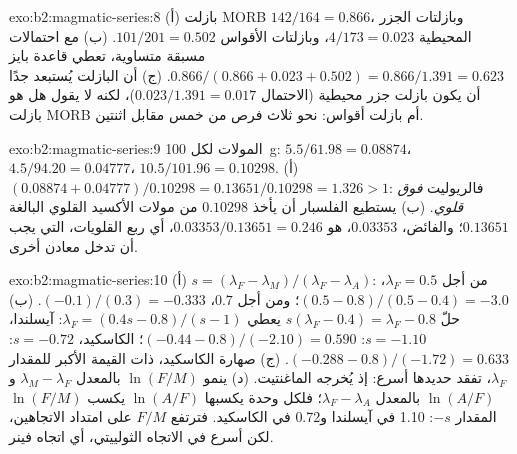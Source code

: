 \begin{solution}{exo:b2:magmatic-series:8}
(أ) بازلت MORB $142/164 = 0.866$، وبازلتات الجزر المحيطية $4/173 = 0.023$، وبازلتات الأقواس $101/201 =
0.502$. (ب) مع احتمالات مسبقة متساوية، تعطي قاعدة بايز $0.866/(0.866 + 0.023 + 0.502) =
0.866/1.391 = 0.623$. (ج) أن البازلت يُستبعد جدًا أن يكون بازلت جزر محيطية
(الاحتمال $0.023/1.391 = 0.017$)، لكنه لا يقول هل هو بازلت MORB أم بازلت أقواس:
نحو ثلاث فرص من خمس مقابل اثنتين.
\end{solution}

\begin{solution}{exo:b2:magmatic-series:9}
المولات لكل \qty{100}{g}:  $5.5/61.98 = 0.08874$،  $4.5/94.20 =
0.04777$،  $10.5/101.96 = 0.10298$. (أ) $(0.08874 + 0.04777)/0.10298 =
0.13651/0.10298 = 1.326 > 1$: فالريوليت \emph{فوق قلوي}. (ب) يستطيع الفلسبار
أن يأخذ $0.10298$ من مولات الأكسيد القلوي البالغة $0.13651$؛ والفائض، $0.03353$، هو
$0.03353/0.13651 = 0.246$، أي ربع القلويات، التي يجب أن تدخل معادن أخرى.
\end{solution}

\begin{solution}{exo:b2:magmatic-series:10}
(أ) $s = (\lambda_F - \lambda_M)/(\lambda_F - \lambda_A)$: من أجل $\lambda_F = 0.5$، $(0.5
- 0.8)/(0.5 - 0.4) = -3.0$؛ ومن أجل $0.7$، $(-0.1)/(0.3) = -0.333$. (ب) حلّ
$s(\lambda_F - 0.4) = \lambda_F - 0.8$ يعطي $\lambda_F = (0.4s - 0.8)/(s - 1)$:
آيسلندا، $s = -1.10$: $(-0.44 - 0.8)/(-2.10) = 0.590$؛ الكاسكيد، $s = -0.72$:
$(-0.288 - 0.8)/(-1.72) = 0.633$. (ج) صهارة الكاسكيد، ذات القيمة الأكبر للمقدار
$\lambda_F$، تفقد حديدها أسرع: إذ يُخرجه الماغنتيت. (د) ينمو $\ln(F/M)$
بالمعدل $\lambda_M - \lambda_F$ و$\ln(A/F)$ بالمعدل $\lambda_F - \lambda_A$؛ فلكل
وحدة يكسبها $\ln(A/F)$ يكسب $\ln(F/M)$ المقدار $-s$: 1.10 في آيسلندا و0.72 في
الكاسكيد. فترتفع $F/M$ على امتداد الاتجاهين، لكن أسرع في الاتجاه الثولييتي، أي اتجاه
فينر.
\end{solution}

